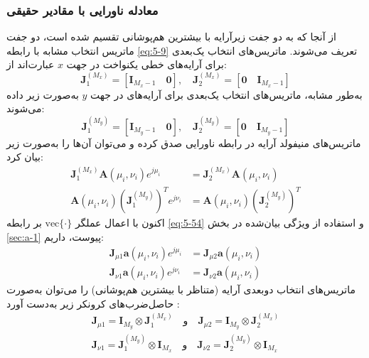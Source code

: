 \subsubsection{معادله ناورایی با مقادیر حقیقی}
\label{subsec:5-5-2-2}
از آنجا که  به دو جفت زیرآرایه با بیشترین هم‌پوشانی تقسیم شده است، دو جفت ماتریس انتخاب مشابه با رابطه \eqref{eq:5-9} تعریف می‌شوند. ماتریس‌های انتخاب یک‌بعدی برای آرایه‌های خطی یکنواخت در جهت $x$ عبارت‌اند از:
\begin{equation}
	\bm{J}_1^{(M_x)} = [\bm{I}_{M_x-1} \quad \bm{0}], \quad \bm{J}_2^{(M_x)} = [\bm{0} \quad \bm{I}_{M_x-1}]
	\label{eq:5-52}
\end{equation}
به‌طور مشابه، ماتریس‌های انتخاب یک‌بعدی برای آرایه‌های  در جهت $y$ به‌صورت زیر داده می‌شوند:
\begin{equation}
	\bm{J}_1^{(M_y)} = [\bm{I}_{M_y-1} \quad \bm{0}], \quad \bm{J}_2^{(M_y)} = [\bm{0} \quad \bm{I}_{M_y-1}]
	\label{eq:5-53}
\end{equation}
ماتریس‌های منیفولد آرایه در رابطه ناورایی صدق کرده و می‌توان آن‌ها را به‌صورت زیر بیان کرد:
\begin{equation}
	\begin{aligned}
		\bm{J}_1^{(M_x)} \bm{A}(\mu_i, \nu_i) e^{j\mu_i} &= \bm{J}_2^{(M_x)} \bm{A}(\mu_i, \nu_i) \\
		\bm{A}(\mu_i, \nu_i) (\bm{J}_1^{(M_y)})^T e^{j\nu_i} &= \bm{A}(\mu_i, \nu_i) (\bm{J}_2^{(M_y)})^T
	\end{aligned}
	\label{eq:5-54}
\end{equation}
اکنون با اعمال عملگر $\text{vec}\{\cdot\}$ بر رابطه \eqref{eq:5-54} و استفاده از ویژگی بیان‌شده در بخش \ref{sec:a-1} پیوست، داریم:
\begin{equation}
	\begin{aligned}
		\bm{J}_{\mu 1} \bm{a}(\mu_i, \nu_i) e^{j\mu_i} &= \bm{J}_{\mu 2} \bm{a}(\mu_i, \nu_i) \\
		\bm{J}_{\nu 1} \bm{a}(\mu_i, \nu_i) e^{j\nu_i} &= \bm{J}_{\nu 2} \bm{a}(\mu_i, \nu_i)
	\end{aligned}
	\label{eq:5-55}
\end{equation}
ماتریس‌های انتخاب دوبعدی آرایه  (متناظر با بیشترین هم‌پوشانی) را می‌توان به‌صورت حاصل‌ضرب‌های کرونکر زیر به‌دست آورد \cite{5-7,5-1}:
\begin{subequations}
\begin{gather}
		\bm{J}_{\mu 1} = \bm{I}_{M_y} \otimes \bm{J}_1^{(M_x)} \quad \text{و} \quad \bm{J}_{\mu 2} = \bm{I}_{M_y} \otimes \bm{J}_2^{(M_x)}
	\label{eq:5-56a}
	\\
	\bm{J}_{\nu 1} = \bm{J}_1^{(M_y)} \otimes \bm{I}_{M_x} \quad \text{و} \quad \bm{J}_{\nu 2} = \bm{J}_2^{(M_y)} \otimes \bm{I}_{M_x}
	\label{eq:5-56b}
\end{gather}
\end{subequations}

